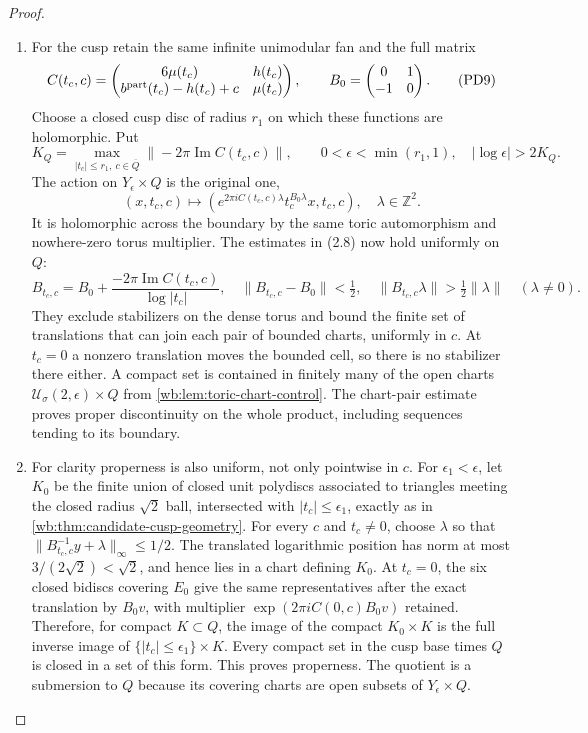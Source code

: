 \begin{proof}
\begin{enumerate}[label=\arabic*.,leftmargin=*]
\item For the cusp retain the same infinite unimodular fan and the full matrix
\[
 C(t_c,c)=
 \begin{pmatrix}6\mu(t_c)&h(t_c)\\
 b^{\rm part}(t_c)-h(t_c)+c&\mu(t_c)
 \end{pmatrix},\qquad
 B_0=\begin{pmatrix}0&1\\-1&0\end{pmatrix}.
 \tag{PD9}
\]
Choose a closed cusp disc of radius $r_1$ on which these functions are
holomorphic. Put
\[
 K_Q=\max_{|t_c|\le r_1,\ c\in\overline Q}
          \|-2\pi\operatorname{Im}C(t_c,c)\|,
 \qquad 0<\epsilon<\min(r_1,1),\quad
          |\log\epsilon|>2K_Q.
 \tag{PD10}
\]
The action on $Y_\epsilon\times Q$ is the original one,
\[
 (x,t_c,c)\longmapsto
 \left(e^{2\pi iC(t_c,c)\lambda}
                  t_c^{B_0\lambda}x,t_c,c\right),
 \quad\lambda\in\mathbb Z^2.
 \tag{PD11}
\]
It is holomorphic across the boundary by the same toric automorphism
and nowhere-zero torus multiplier. The estimates in (2.8) now hold
uniformly on $Q$:
\[
 B_{t_c,c}=B_0+
       \frac{-2\pi\operatorname{Im}C(t_c,c)}{\log|t_c|},\quad
 \|B_{t_c,c}-B_0\|<\tfrac12,\quad
 \|B_{t_c,c}\lambda\|>\tfrac12\|\lambda\|\quad(\lambda\ne0).
 \tag{PD12}
\]
They exclude stabilizers on the dense torus and bound the finite set
of translations that can join each pair of bounded charts, uniformly
in $c$. At $t_c=0$ a nonzero translation moves the bounded cell, so
there is no stabilizer there either. A compact set is contained in finitely
many of the open charts $\mathcal U_\sigma(2,\epsilon)\times Q$ from
\cref{wb:lem:toric-chart-control}.
The chart-pair estimate proves proper discontinuity on the whole
product, including sequences tending to its boundary.

\item For clarity properness is also uniform, not only pointwise in $c$.
For $\epsilon_1<\epsilon$, let $K_0$ be the finite union of closed
unit polydiscs associated to triangles meeting the closed radius
$\sqrt2$ ball, intersected with $|t_c|\le\epsilon_1$, exactly as in
\cref{wb:thm:candidate-cusp-geometry}. For every $c$ and $t_c\ne0$,
choose $\lambda$ so that
$\|B_{t_c,c}^{-1}y+\lambda\|_\infty\le1/2$.
The translated logarithmic position has norm at most
$3/(2\sqrt2)<\sqrt2$, and hence lies in a chart defining $K_0$.
At $t_c=0$, the six closed bidiscs covering $E_0$ give the same
representatives after the exact translation by $B_0v$, with multiplier
$\exp(2\pi iC(0,c)B_0v)$ retained. Therefore, for compact $K\subset Q$,
the image of the compact $K_0\times K$ is the full inverse image of
$\{|t_c|\le\epsilon_1\}\times K$. Every compact set in the cusp
base times $Q$ is closed in a set of this form. This proves properness.
The quotient is a submersion to $Q$ because its covering charts are
open subsets of $Y_\epsilon\times Q$.


\end{enumerate}
\end{proof}
